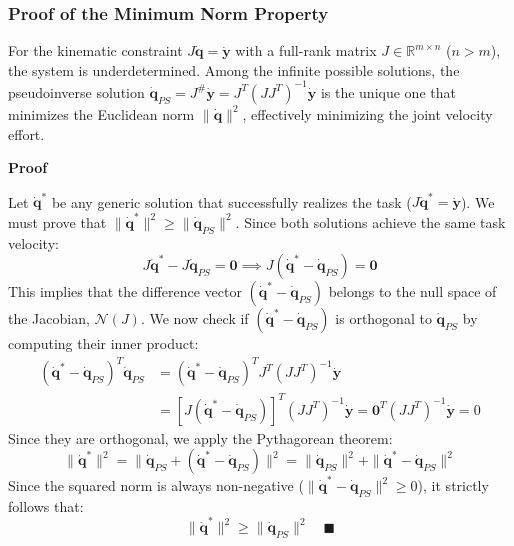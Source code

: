 \subsubsection{Proof of the Minimum Norm Property}
For the kinematic constraint $J\dot{\mathbf{q}} = \dot{\mathbf{y}}$ with a full-rank matrix 
$J \in \mathbb{R}^{m \times n}$ ($n > m$), the system is underdetermined. 
Among the infinite possible solutions, the pseudoinverse solution 
$\dot{\mathbf{q}}_{PS} = J^\#\dot{\mathbf{y}} = J^T(JJ^T)^{-1}\dot{\mathbf{y}}$ is 
the unique one that minimizes the Euclidean norm $\|\dot{\mathbf{q}}\|^2$,
effectively minimizing the joint velocity effort.


\textbf{Proof} 

Let $\dot{\mathbf{q}}^*$ be any generic solution that successfully realizes the task ($J\dot{\mathbf{q}}^* = \dot{\mathbf{y}}$). We must prove that $\|\dot{\mathbf{q}}^*\|^2 \ge \|\dot{\mathbf{q}}_{PS}\|^2$.
Since both solutions achieve the same task velocity:
\begin{equation}
    J\dot{\mathbf{q}}^* - J\dot{\mathbf{q}}_{PS} = \mathbf{0} \implies J(\dot{\mathbf{q}}^* - \dot{\mathbf{q}}_{PS}) = \mathbf{0}
\end{equation}
This implies that the difference vector $(\dot{\mathbf{q}}^* - \dot{\mathbf{q}}_{PS})$ belongs to the null space of the Jacobian, $\mathcal{N}(J)$. We now check if $(\dot{\mathbf{q}}^* - \dot{\mathbf{q}}_{PS})$ is orthogonal to $\dot{\mathbf{q}}_{PS}$ by computing their inner product:
\begin{align}
    (\dot{\mathbf{q}}^* - \dot{\mathbf{q}}_{PS})^T \dot{\mathbf{q}}_{PS} &= (\dot{\mathbf{q}}^* - \dot{\mathbf{q}}_{PS})^T J^T (J J^T)^{-1} \dot{\mathbf{y}} \\
    &= \left[ J (\dot{\mathbf{q}}^* - \dot{\mathbf{q}}_{PS}) \right]^T (J J^T)^{-1} \dot{\mathbf{y}} = \mathbf{0}^T (J J^T)^{-1} \dot{\mathbf{y}} = 0
\end{align}
Since they are orthogonal, we apply the Pythagorean theorem:
\begin{equation}
    \|\dot{\mathbf{q}}^*\|^2 = \|\dot{\mathbf{q}}_{PS} + (\dot{\mathbf{q}}^* - \dot{\mathbf{q}}_{PS})\|^2 = \|\dot{\mathbf{q}}_{PS}\|^2 + \|\dot{\mathbf{q}}^* - \dot{\mathbf{q}}_{PS}\|^2
\end{equation}
Since the squared norm is always non-negative ($\|\dot{\mathbf{q}}^* - \dot{\mathbf{q}}_{PS}\|^2 \ge 0$), it strictly follows that:
\begin{equation}
    \|\dot{\mathbf{q}}^*\|^2 \ge \|\dot{\mathbf{q}}_{PS}\|^2 \quad \blacksquare
\end{equation}

